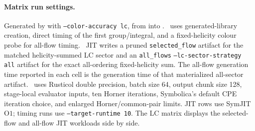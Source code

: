 \paragraph{Matrix run settings.}
\noindent\footnotesize Generated by  with \texttt{--color-accuracy lc}, from  into . \AC\ uses generated-library creation, direct timing of the first group/integral, and a fixed-helicity colour probe for all-flow timing. \PAC\ JIT writes a pruned \texttt{selected\_flow} artifact for the matched helicity-summed LC sector and an \texttt{all\_flows} \texttt{--lc-sector-strategy all} artifact for the exact all-ordering fixed-helicity sum.  The all-flow generation time reported in each cell is the generation time of that materialized all-sector artifact. \PAC\ uses Rusticol double precision, batch size 64, output chunk size 128, stage-local evaluator inputs, ten Horner iterations, Symbolica's default CPE iteration choice, and enlarged Horner/common-pair limits.  JIT rows use SymJIT \(\mathrm{O}1\); timing runs use \texttt{--target-runtime 10}.  The LC matrix displays the selected-flow and all-flow JIT workloads side by side.
\par\smallskip